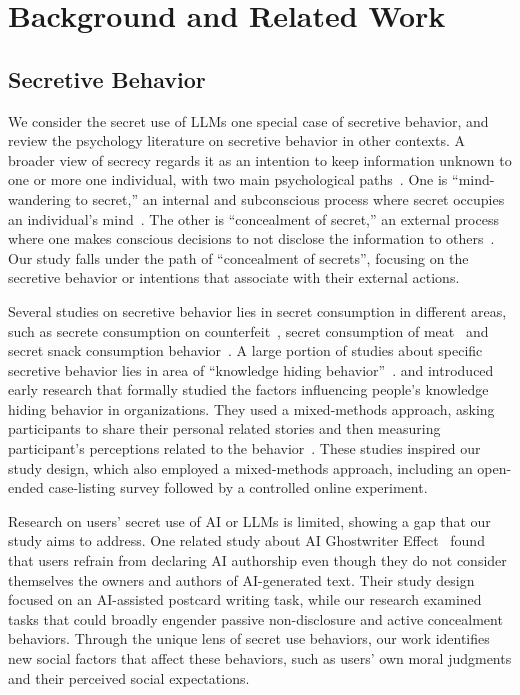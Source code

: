 \section{Background and Related Work}



\subsection{Secretive Behavior}

We consider the secret use of LLMs one special case of secretive behavior, and review the psychology literature on secretive behavior in other contexts.
A broader view of secrecy regards it as an intention to keep information unknown to one or more one individual, with two main psychological paths~\cite{slepian2022process, slepian2017experience}. 
One is ``mind-wandering to secret,'' an internal and subconscious process where secret occupies an individual's mind~\cite{slepian2022process, slepian2017experience}. 
The other is ``concealment of secret,'' an external process where one makes conscious decisions to not disclose the information to others~\cite{slepian2022process, slepian2017experience}.
Our study falls under the path of ``concealment of secrets'', focusing on the secretive behavior or intentions that associate with their external actions.


Several studies on secretive behavior lies in secret consumption in different areas, such as secrete consumption on counterfeit~\cite{bian2016new}, secret consumption of meat~\cite{khara2020we} and secret snack consumption behavior~\cite{forbes2016analysis}.
A large portion of studies about specific secretive behavior lies in area of ``knowledge hiding behavior''~\cite{connelly2012knowledge, serenko2016understanding, arshad2018workplace, kumar2018you}.
\citet{connelly2012knowledge} and \citet{serenko2016understanding} introduced early research that formally studied the factors influencing people's knowledge hiding behavior in organizations. 
They used a mixed-methods approach, asking participants to share their personal related stories and then measuring participant's perceptions related to the behavior~\cite{connelly2012knowledge, serenko2016understanding}.
These studies inspired our study design, which also employed a mixed-methods approach, including an open-ended case-listing survey followed by a controlled online experiment.


Research on users' secret use of AI or LLMs is limited, showing a gap that our study aims to address. 
One related study about AI Ghostwriter Effect~\cite{draxler2023ai} found that users refrain from declaring AI authorship even though they do not consider themselves the owners and authors of AI-generated text.
Their study design focused on an AI-assisted postcard writing task, while our research examined tasks that could broadly engender passive non-disclosure and active concealment behaviors.
Through the unique lens of secret use behaviors, our work identifies new social factors that affect these behaviors, such as users' own moral judgments and their perceived social expectations.


